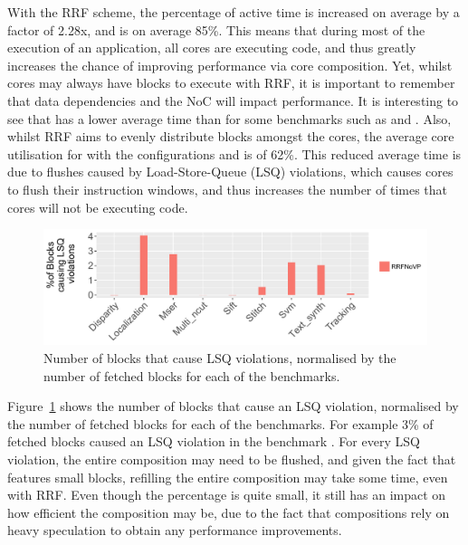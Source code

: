 With the RRF scheme, the percentage of active time is increased on average by a factor of 2.28x, and is on average 85\%.
This means that during most of the execution of an application, all cores are executing code, and thus greatly increases the chance of improving performance via core composition.
Yet, whilst cores may always have blocks to execute with RRF, it is important to remember that data dependencies and the NoC will impact performance.
It is interesting to see that \nfvp{} has a lower average time than \nfnovp{} for some benchmarks such as  and .
Also, whilst RRF aims to evenly distribute blocks amongst the cores, the average core utilisation for  with the configurations \nfnovp{} and \nfvp{} is of 62\%.
This reduced average time is due to flushes caused by Load-Store-Queue (LSQ) violations, which causes cores to flush their instruction windows, and thus increases the number of times that cores will not be executing code.

\begin{figure}[t]
    \centering
    \includegraphics[width=1\textwidth]{chapter3/graphics/lsqViol4.pdf}
    \caption{Number of blocks that cause LSQ violations, normalised by the number of fetched blocks for each of the benchmarks.}
    \label{fig:lsqvio}
	\vspace{1em}
\end{figure}

Figure~\ref{fig:lsqvio} shows the number of blocks that cause an LSQ violation, normalised by the number of fetched blocks for each of the benchmarks.
For example 3\% of fetched blocks caused an LSQ violation in the benchmark .
For every LSQ violation, the entire composition may need to be flushed, and given the fact that  features small blocks, refilling the entire composition may take some time, even with RRF.
Even though the percentage is quite small, it still has an impact on how efficient the composition may be, due to the fact that compositions rely on heavy speculation to obtain any performance improvements.

